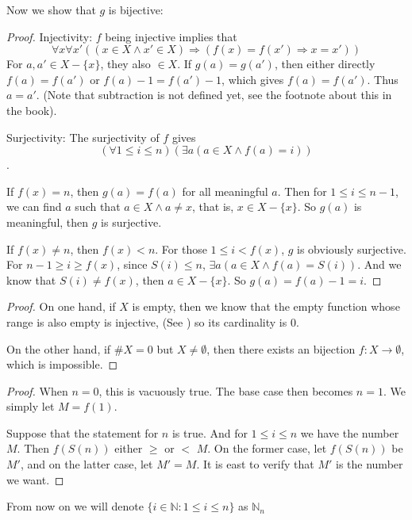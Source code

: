 Now we show that $g$ is bijective:
\begin{proof}
Injectivity: $f$ being injective implies that 
\[
\forall x \forall x'((x \in X \wedge x' \in X) \Longrightarrow (f(x) = f(x') \Rightarrow x = x'))
\]
For $a,a' \in X - \{x\}$, they also $\in X$. If $g(a) = g(a')$, then either directly $f(a) = f(a')$ or 
$f(a) - 1 = f(a') - 1$, which gives $f(a) = f(a')$. Thus $a = a'$. (Note that subtraction is not defined 
yet, see the footnote about this in the book).

Surjectivity: The surjectivity of $f$ gives 
\[
(\forall 1 \leq i \leq n)(\exists a(a \in X \wedge f(a) = i))
\].

If $f(x) = n$, then $g(a) = f(a)$ for all meaningful $a$. Then for $1 \leq i \leq n-1$, we can find $a$ 
such that $a \in X \wedge a \neq x$, that is, $x \in X - \{x\}$. So $g(a)$ is meaningful, then $g$ is 
surjective.

If $f(x) \neq n$, then $f(x) < n$. For those $1 \leq i < f(x)$, $g$ is obviously surjective. For 
$n-1 \geq i \geq f(x)$, since $S(i) \leq n$, $\exists a(a \in X \wedge f(a) = S(i))$. And we know that 
$S(i) \neq f(x)$, then $a \in X - \{x\}$. So $g(a) = f(a) - 1 = i$.
\end{proof}

\begin{proof}
On one hand, if $X$ is empty, then we know that the empty function whose range is also empty is injective, 
(See ) so its cardinality is $0$. 

On the other hand, if $\# X = 0$ but $X \neq \emptyset$, then there exists an bijection 
$f:X \rightarrow \emptyset$, which is impossible.
\end{proof}

\begin{proof}
When $n = 0$, this is vacuously true. The base case then becomes $n=1$. We simply let $M = f(1)$.

Suppose that the statement for $n$ is true. And for $1\leq i\leq n$ we have the number $M$. Then $f(S(n))$ 
either $\geq$ or $<$ $M$. On the former case, let $f(S(n))$ be $M'$, and on the latter case, let $M' = M$. 
It is east to verify that $M'$ is the number we want.
\end{proof}

From now on we will denote $\{i\in \mathbb{N}:1\leq i \leq n\}$ as $\mathbb{N}_n$

